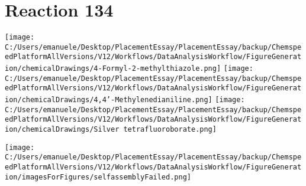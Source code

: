 \documentclass{article}%
\begin{document}
\section*{Reaction 134}%
%
\begin{scheme}[H]%
\begin{minipage}{0.5\textwidth}%
\texttt{[image: C:/Users/emanuele/Desktop/PlacementEssay/PlacementEssay/backup/ChemspeedPlatformAllVersions/V12/Workflows/DataAnalysisWorkflow/FigureGeneration/chemicalDrawings/4-Formyl-2-methylthiazole.png]}%
\texttt{[image: C:/Users/emanuele/Desktop/PlacementEssay/PlacementEssay/backup/ChemspeedPlatformAllVersions/V12/Workflows/DataAnalysisWorkflow/FigureGeneration/chemicalDrawings/4,4'-Methylenedianiline.png]}%
\texttt{[image: C:/Users/emanuele/Desktop/PlacementEssay/PlacementEssay/backup/ChemspeedPlatformAllVersions/V12/Workflows/DataAnalysisWorkflow/FigureGeneration/chemicalDrawings/Silver tetrafluoroborate.png]}%
\end{minipage}%
\begin{minipage}{0.5\textwidth}%
\begin{center}%
\texttt{[image: C:/Users/emanuele/Desktop/PlacementEssay/PlacementEssay/backup/ChemspeedPlatformAllVersions/V12/Workflows/DataAnalysisWorkflow/FigureGeneration/imagesForFigures/selfassemblyFailed.png]}%
\end{center}%
\end{minipage}%
\caption{Self-assembly of components 1, 17, with Silver(I) in a 3.0:1.5:1.0 molar ratio in CH$_3$CN at 60\textdegree C for 40h. These are the reagents (starting materials) for reaction 134.}%
\end{scheme}%
\end{document}
